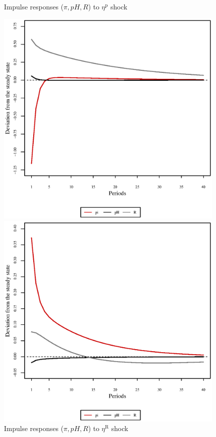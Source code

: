\begin{figure}[h]
\begin{minipage}{0.5\textwidth}
\caption{Impulse responses ($\pi, {p\!H}, R$) to $\eta^{\mathrm{p}}$ shock}
\end{minipage}
\end{figure}

\begin{figure}[h]
\begin{minipage}{0.5\textwidth}
\vspace*{-3em}
\centering
\includegraphics[width=0.99\textwidth, scale=0.55]{plots/plot_68.eps}
\caption{Impulse responses ($\pi, {p\!H}, R$) to $\eta^{\mathrm{R}}$ shock}
\end{minipage}
\begin{minipage}{0.5\textwidth}
\vspace*{-3em}
\centering
\includegraphics[width=0.99\textwidth, scale=0.55]{plots/plot_69.eps}

\end{minipage}
\end{figure}
